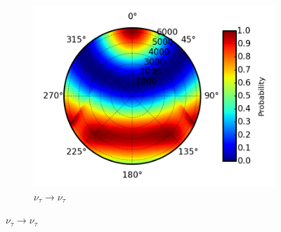 \documentclass{beamer}
\begin{document}
\begin{frame}
\begin{figure}
\begin{subfigure}[b]{0.33\linewidth}
			\caption{ $\nu_{\tau} \rightarrow \nu_{\tau}$ }
			\includegraphics[width=\linewidth]{earth_10.0gev_nutau2nutau_throughEarth.png}
		\end{subfigure}
	\end{figure}
\end{frame}
\end{document}
